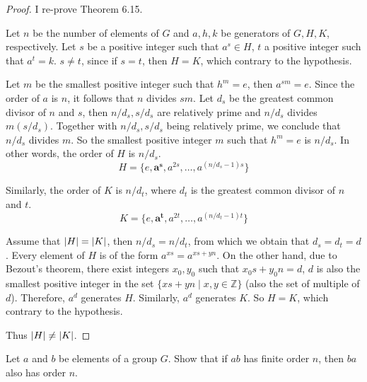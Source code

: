 \begin{proof}
    I re-prove Theorem 6.15.

    Let $n$ be the number of elements of $G$ and $a, h, k$ be generators of $G, H, K$, respectively. Let $s$ be a positive integer such that $a^{s}\in H$, $t$ a positive integer such that $a^{t} = k$. $s \ne t$, since if $s = t$, then $H = K$, which contrary to the hypothesis.

    Let $m$ be the smallest positive integer such that $h^{m} = e$, then $a^{sm} = e$. Since the order of $a$ is $n$, it follows that $n$ divides $sm$. Let $d_{s}$ be the greatest common divisor of $n$ and $s$, then $n/d_{s}, s/d_{s}$ are relatively prime and $n/d_{s}$ divides $m(s/d_{s})$. Together with $n/d_{s}, s/d_{s}$ being relatively prime, we conclude that $n/d_{s}$ divides $m$. So the smallest positive integer $m$ such that $h^{m} = e$ is $n/d_{s}$. In other words, the order of $H$ is $n/d_{s}$.
    \[
        H = \{ e, \mathbf{a^{s}}, a^{2s}, \ldots, a^{(n/d_{s} - 1)s} \}
    \]

    Similarly, the order of $K$ is $n/d_{t}$, where $d_{t}$ is the greatest common divisor of $n$ and $t$.
    \[
        K = \{ e, \mathbf{a^{t}}, a^{2t}, \ldots, a^{(n/d_{t} - 1)t} \}
    \]

    Assume that $\left\vert{H}\right\vert = \left\vert{K}\right\vert$, then $n/d_{s} = n/d_{t}$, from which we obtain that $d_{s} = d_{t} = d$. Every element of $H$ is of the form $a^{xs} = a^{xs + yn}$. On the other hand, due to Bezout's theorem, there exist integers $x_{0}, y_{0}$ such that $x_{0}s + y_{0}n = d$, $d$ is also the smallest positive integer in the set $\{ xs + yn \mid x, y\in\mathbb{Z} \}$ (also the set of multiple of $d$). Therefore, $a^{d}$ generates $H$. Similarly, $a^{d}$ generates $K$. So $H = K$, which contrary to the hypothesis.

    Thus $\left\vert{H}\right\vert \ne \left\vert{K}\right\vert$.
\end{proof}

\newpage
\begin{exercise}
    Let $a$ and $b$ be elements of a group $G$. Show that if $ab$ has finite order $n$, then $ba$ also has order $n$.
\end{exercise}

